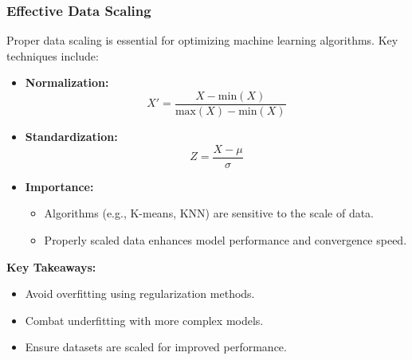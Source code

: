 \documentclass[aspectratio=169]{beamer}
\begin{document}
\begin{frame}[fragile]
    \frametitle{Effective Data Scaling}

    Proper data scaling is essential for optimizing machine learning algorithms. Key techniques include:
    
    \begin{itemize}
        \item \textbf{Normalization:}
        \begin{equation}
        X' = \frac{X - \text{min}(X)}{\text{max}(X) - \text{min}(X)}
        \end{equation}

        \item \textbf{Standardization:}
        \begin{equation}
        Z = \frac{X - \mu}{\sigma}
        \end{equation}

        \item \textbf{Importance:} 
        \begin{itemize}
            \item Algorithms (e.g., K-means, KNN) are sensitive to the scale of data.
            \item Properly scaled data enhances model performance and convergence speed.
        \end{itemize}
    \end{itemize}
    
    \textbf{Key Takeaways:}
    \begin{itemize}
        \item Avoid overfitting using regularization methods.
        \item Combat underfitting with more complex models.
        \item Ensure datasets are scaled for improved performance.
    \end{itemize}
\end{frame}
\end{document}
